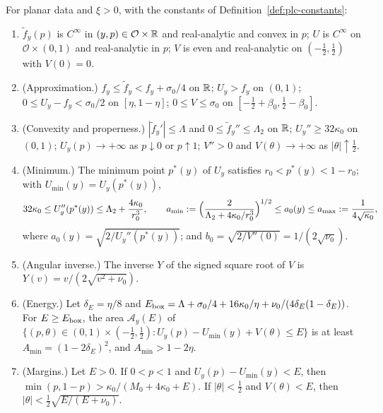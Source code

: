 \begin{lemma}\label{lem:plc-potentials}
For planar data and $\xi>0$, with the constants of Definition~\ref{def:plc-constants}:
\begin{enumerate}[label=(\alph*)]
\item $\tilde f_y(p)$ is $C^\infty$ in $(y,p)\in\mathcal O\times\mathbb{R}$ and real-analytic and convex in $p$; $U$ is $C^\infty$ on
 $\mathcal O\times(0,1)$ and real-analytic in $p$; $V$ is even and real-analytic on $(-\frac12,\frac12)$ with $V(0)=0$.
\item (Approximation.) $f_y\le \tilde f_y<f_y+\sigma_0/4$ on $\mathbb{R}$; $U_y>f_y$ on $(0,1)$; $0\le U_y-f_y<\sigma_0/2$ on
 $[\eta,1-\eta]$; $0\le V\le\sigma_0$ on $[-\frac12+\beta_0,\frac12-\beta_0]$.
\item (Convexity and properness.) $|\tilde f_y'|\le\Lambda$ and $0\le \tilde f_y''\le\Lambda_2$ on $\mathbb{R}$; $U_y''\ge32\kappa_0$ on $(0,1)$;
 $U_y(p)\to+\infty$ as $p\downarrow0$ or $p\uparrow1$; $V''>0$ and $V(\theta)\to+\infty$ as $|\theta|\uparrow\frac12$.

\item (Minimum.) The minimum point $p^*(y)$ of $U_y$ satisfies $r_0<p^*(y)<1-r_0$; with $U_{\min}(y)=U_y(p^*(y))$,
 \[
  32\kappa_0\le U_y''(p^*(y))\le\Lambda_2+\frac{4\kappa_0}{r_0^3},\qquad
  a_{\min}:=\Bigl(\frac{2}{\Lambda_2+4\kappa_0/r_0^3}\Bigr)^{1/2}\le a_0(y)\le a_{\max}:=\frac1{4\sqrt{\kappa_0}},
 \]
 where $a_0(y)=\sqrt{2/U_y''(p^*(y))}$; and $b_0=\sqrt{2/V''(0)}=1/(2\sqrt{\nu_0})$.
\item (Angular inverse.) The inverse $Y$ of the signed square root of $V$ is $Y(v)=v/(2\sqrt{v^2+\nu_0})$.
\item (Energy.) Let $\delta_E=\eta/8$ and $E_{\rm box}=\Lambda+\sigma_0/4+16\kappa_0/\eta+\nu_0/(4\delta_E(1-\delta_E))$. For
 $E\ge E_{\rm box}$, the area $\mathcal A_y(E)$ of $\{(p,\theta)\in(0,1)\times(-\frac12,\frac12):U_y(p)-U_{\min}(y)+V(\theta)\le E\}$ is at least
 $A_{\min}=(1-2\delta_E)^2$, and $A_{\min}>1-2\eta$.
\item (Margins.) Let $E>0$. If $0<p<1$ and $U_y(p)-U_{\min}(y)<E$, then
 $\min(p,1-p)>\kappa_0/(M_0+4\kappa_0+E)$. If $|\theta|<\frac12$ and $V(\theta)<E$, then
 $|\theta|<\frac12\sqrt{E/(E+\nu_0)}$.
\end{enumerate}
\end{lemma}


